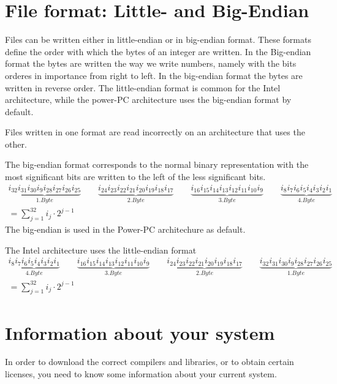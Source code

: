 \documentclass[a4paper,10pt]{report}
\begin{document}
\section{File format: Little- and Big-Endian}
Files can be written either in little-endian or in big-endian
format. These formats define the order with which the bytes of an
integer are written. In the Big-endian format the bytes are written
the way we write numbers, namely with the bits orderes in importance
from right to left. In the big-endian format the bytes are written in
reverse order. The little-endian format is common for the Intel
architecture, while the power-PC architecture uses the big-endian
format by default.

Files written in one format are read incorrectly on an architecture
that uses the other.

The big-endian format corresponds to the normal binary representation
with the most significant bits are written to the left of the less
significant bits.
\begin{eqnarray}
\underbrace{i_{32}i_{31}i_{30}i_{9}i_{28}i_{27}i_{26}i_{25}}_{1.Byte}
\qquad
\underbrace{i_{24}i_{23}i_{22}i_{21}i_{20}i_{19}i_{18}i_{17}}_{2. Byte}
\qquad
\underbrace{i_{16}i_{15}i_{14}i_{13}i_{12}i_{11}i_{10}i_{9}}_{3. Byte}
\qquad
\underbrace{i_{8}i_{7}i_{6}i_{5}i_{4}i_{3}i_{2}i_{1}}_{4. Byte}
\\
=\sum_{j=1}^{32} i_j\cdot 2^{j-1}
\end{eqnarray}
The big-endian is used in the Power-PC architechure as default.

The Intel architecture uses the little-endian format
\begin{eqnarray}
\underbrace{i_{8}i_{7}i_{6}i_{5}i_{4}i_{3}i_{2}i_{1}}_{4. Byte}
\qquad
\underbrace{i_{16}i_{15}i_{14}i_{13}i_{12}i_{11}i_{10}i_{9}}_{3. Byte}
\qquad
\underbrace{i_{24}i_{23}i_{22}i_{21}i_{20}i_{19}i_{18}i_{17}}_{2. Byte}
\qquad
\underbrace{i_{32}i_{31}i_{30}i_{9}i_{28}i_{27}i_{26}i_{25}}_{1.Byte}
\\
=\sum_{j=1}^{32} i_j\cdot 2^{j-1}
\end{eqnarray}

\section{Information about your system}
In order to download the correct compilers and libraries, or to obtain
certain licenses, you need to know some information about your current
system.
\end{document}
